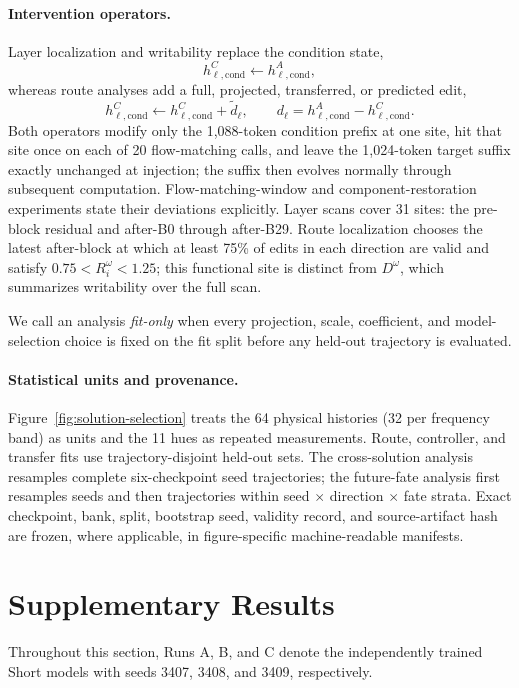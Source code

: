 \paragraph{Intervention operators.}
Layer localization and writability replace the condition state,
\[
h^C_{\ell,\mathrm{cond}}\leftarrow h^A_{\ell,\mathrm{cond}},
\]
whereas route analyses add a full, projected, transferred, or predicted edit,
\[
h^C_{\ell,\mathrm{cond}}
\leftarrow h^C_{\ell,\mathrm{cond}}+\tilde d_\ell,
\qquad d_\ell=h^A_{\ell,\mathrm{cond}}-h^C_{\ell,\mathrm{cond}}.
\]
Both operators modify only the 1,088-token condition prefix at one site, hit
that site once on each of 20 flow-matching calls, and leave the 1,024-token
target suffix exactly unchanged at injection; the suffix then evolves normally
through subsequent computation. Flow-matching-window and component-restoration experiments
state their deviations explicitly. Layer scans cover 31 sites: the pre-block
residual and after-B0 through after-B29. Route localization chooses the latest
after-block at which at least 75\% of edits in each direction are valid and
satisfy $0.75<R_i^\omega<1.25$; this functional site is distinct from
$D^\omega$, which summarizes writability over the full scan.

We call an analysis \emph{fit-only} when every projection, scale, coefficient,
and model-selection choice is fixed on the fit split before any held-out
trajectory is evaluated.

\paragraph{Statistical units and provenance.}
Figure~\ref{fig:solution-selection} treats the 64 physical histories (32 per
frequency band) as units and the 11 hues as repeated measurements. Route,
controller, and transfer fits use trajectory-disjoint held-out sets. The
cross-solution analysis resamples complete six-checkpoint seed trajectories;
the future-fate analysis first resamples seeds and then trajectories within
seed $\times$ direction $\times$ fate strata. Exact checkpoint, bank, split,
bootstrap seed, validity record, and source-artifact hash are frozen, where
applicable, in figure-specific machine-readable manifests.

\section{Supplementary Results}

Throughout this section, Runs A, B, and C denote the independently trained
Short models with seeds 3407, 3408, and 3409, respectively.

